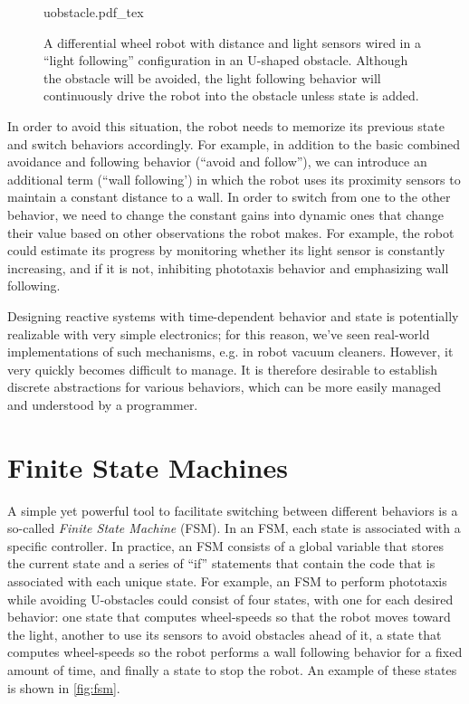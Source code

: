 \begin{figure}
\centering
    \def\svgwidth{0.64\textwidth}
    {uobstacle.pdf_tex}
    \caption{\label{fig:uobstacle}A differential wheel robot with distance and light sensors wired in a ``light following'' configuration in an U-shaped obstacle. Although the obstacle will be avoided, the light following behavior will continuously drive the robot into the obstacle unless state is added.}
\end{figure}

In order to avoid this situation, the robot needs to memorize its previous state and switch behaviors accordingly. For example, in addition to the basic combined avoidance and following behavior (``avoid and follow''), we can introduce an additional term (``wall following') in which the robot uses its proximity sensors to maintain a constant distance to a wall. In order to switch from one to the other behavior, we need to change the constant gains into dynamic ones that change their value based on other observations the robot makes. For example, the robot could estimate its progress by monitoring whether its light sensor is constantly increasing, and if it is not, inhibiting phototaxis behavior and emphasizing wall following.

Designing reactive systems with time-dependent behavior and state is potentially realizable with very simple electronics; for this reason, we've seen real-world implementations of such mechanisms, e.g. in robot vacuum cleaners.
However, it very quickly becomes difficult to manage. It is therefore desirable to establish discrete abstractions for various behaviors, which can be more easily managed and understood by a programmer.

\section{Finite State Machines}\label{sec:fsm}

A simple yet powerful tool to facilitate switching between different behaviors is a so-called \textsl{Finite State Machine} (FSM). In an FSM, each state is associated with a specific controller. In practice, an FSM consists of a global variable that stores the current state and a series of ``if'' statements that contain the code that is associated with each unique state. For example, an FSM to perform phototaxis while avoiding U-obstacles could consist of four states, with one for each desired behavior: one state that computes wheel-speeds so that the robot moves toward the light, another to use its sensors to avoid obstacles ahead of it, a state that computes wheel-speeds so the robot performs a wall following behavior for a fixed amount of time, and finally a state to stop the robot. An example of these states is shown in \cref{fig:fsm}.

